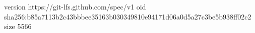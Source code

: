 version https://git-lfs.github.com/spec/v1
oid sha256:b85a7113b2c43bbbee35163b030349810e94171d06a0d5a27c3be5b938ff02c2
size 5566
